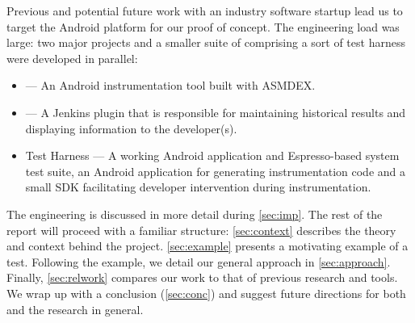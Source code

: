 Previous and potential future work with an industry software startup lead us to
target the Android platform for our proof of concept. The engineering load was
large: two major projects and a smaller suite of comprising a sort of test
harness were developed in parallel:

\begin{itemize}
	\item \venera --- An Android instrumentation tool built with ASMDEX.
	\item \jenkinsPlugin --- A Jenkins plugin that is responsible for maintaining
	historical results and displaying information to the developer(s).
	\item Test Harness --- A working Android application and
	Espresso-based system test suite, an Android application for generating
	instrumentation code and a small SDK facilitating developer intervention
	during instrumentation.
\end{itemize}

The engineering is discussed in more detail during \autoref{sec:imp}. The rest
of the report will proceed with a familiar structure: \autoref{sec:context}
describes the theory and context behind the project. \autoref{sec:example}
presents a motivating example of a \flaky test. Following the example, we detail
our general approach in \autoref{sec:approach}. Finally, \autoref{sec:relwork}
compares our work to that of previous research and tools. We wrap up with a
conclusion (\autoref{sec:conc}) and suggest future directions for both \venera
and the research in general.
